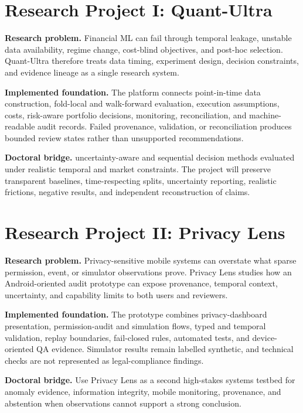 \documentclass[11pt]{article}
\begin{document}
\section*{Research Project I: Quant-Ultra}
\textbf{Research problem.} Financial ML can fail through temporal leakage, unstable data availability, regime change, cost-blind objectives, and post-hoc selection. Quant-Ultra therefore treats data timing, experiment design, decision constraints, and evidence lineage as a single research system.

\textbf{Implemented foundation.} The platform connects point-in-time data construction, fold-local and walk-forward evaluation, execution assumptions, costs, risk-aware portfolio decisions, monitoring, reconciliation, and machine-readable audit records. Failed provenance, validation, or reconciliation produces bounded review states rather than unsupported recommendations.

\textbf{Doctoral bridge.} uncertainty-aware and sequential decision methods evaluated under realistic temporal and market constraints. The project will preserve transparent baselines, time-respecting splits, uncertainty reporting, realistic frictions, negative results, and independent reconstruction of claims.

\section*{Research Project II: Privacy Lens}
\textbf{Research problem.} Privacy-sensitive mobile systems can overstate what sparse permission, event, or simulator observations prove. Privacy Lens studies how an Android-oriented audit prototype can expose provenance, temporal context, uncertainty, and capability limits to both users and reviewers.

\textbf{Implemented foundation.} The prototype combines privacy-dashboard presentation, permission-audit and simulation flows, typed and temporal validation, replay boundaries, fail-closed rules, automated tests, and device-oriented QA evidence. Simulator results remain labelled synthetic, and technical checks are not represented as legal-compliance findings.

\textbf{Doctoral bridge.} Use Privacy Lens as a second high-stakes systems testbed for anomaly evidence, information integrity, mobile monitoring, provenance, and abstention when observations cannot support a strong conclusion.
\end{document}
